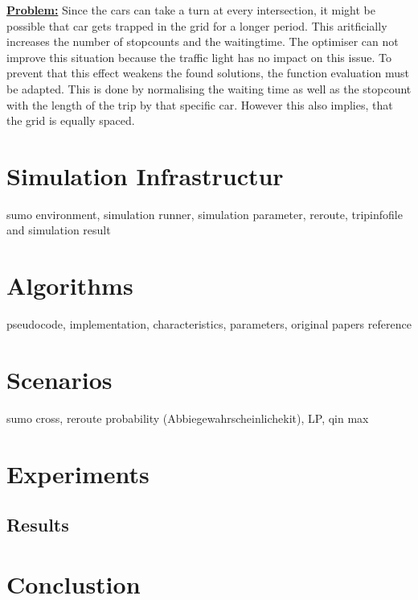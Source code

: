 \documentclass[./\jobname.tex]{subfiles}
\begin{document}
\newpage
\textbf{\underline{Problem:}} Since the cars can take a turn at every intersection, it might be possible that car gets trapped in the grid for a longer period. This aritficially increases the number of stopcounts and the waitingtime. The optimiser can not improve this situation because the traffic light has no impact on this issue. To prevent that this effect weakens the found solutions, the function evaluation must be adapted. This is done by normalising the waiting time as well as the stopcount with the length of the trip by that specific car. However this also implies, that the grid is equally spaced. 

\chapter{Simulation Infrastructur}
sumo environment, simulation runner, simulation parameter, reroute, tripinfofile and simulation result

\chapter{Algorithms}
pseudocode, implementation, characteristics, parameters, original papers reference

\chapter{Scenarios}
sumo cross, reroute probability (Abbiegewahrscheinlichekit), LP, qin max

\chapter{Experiments}

\section{Results}

\chapter{Conclustion}
\end{document}

